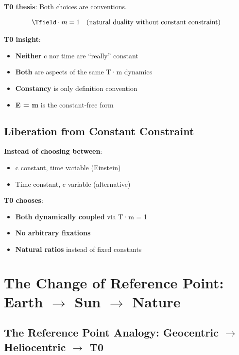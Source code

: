 	\textbf{T0 thesis}: Both choices are conventions.
	
	\begin{equation}
		\Tfield \cdot m = 1 \quad \text{(natural duality without constant constraint)}
	\end{equation}
	
	\textbf{T0 insight}:
	\begin{itemize}
		\item \textbf{Neither} c nor time are ``really'' constant
		\item \textbf{Both} are aspects of the same T·m dynamics
		\item \textbf{Constancy} is only definition convention
		\item \textbf{E = m} is the constant-free form
	\end{itemize}
	
	\subsection{Liberation from Constant Constraint}
	
	\textbf{Instead of choosing between}:
	\begin{itemize}
		\item c constant, time variable (Einstein)
		\item Time constant, c variable (alternative)
	\end{itemize}
	
	\textbf{T0 chooses}:
	\begin{itemize}
		\item \textbf{Both dynamically coupled} via T·m = 1
		\item \textbf{No arbitrary fixations}
		\item \textbf{Natural ratios} instead of fixed constants
	\end{itemize}
	
	\section{The Change of Reference Point: Earth $\rightarrow$ Sun $\rightarrow$ Nature}
	
	\subsection{The Reference Point Analogy: Geocentric $\rightarrow$ Heliocentric $\rightarrow$ T0}
	
